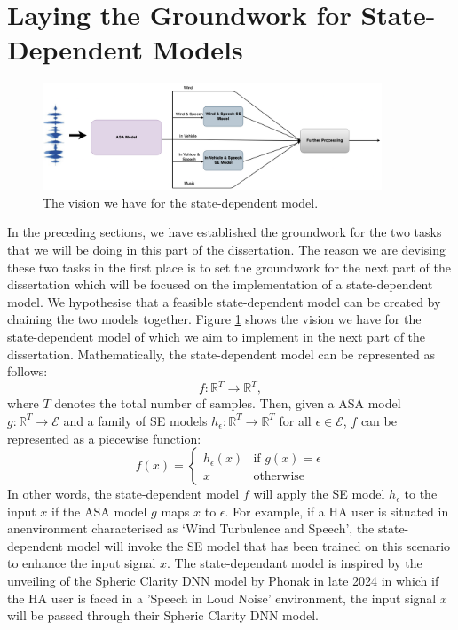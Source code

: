 \documentclass[logo,bsc,singlespacing,parskip,online]{infthesis}
\begin{document}
\section{Laying the Groundwork for State-Dependent Models}
\begin{figure}[h] \centering
   \includegraphics[width=0.9\textwidth]{state-model-diagram.png}
   \caption{The vision we have for the state-dependent model.}
   \label{fig:state-dependent-model}
\end{figure}
In the preceding sections, we have established the groundwork for the two tasks that we will be doing in this part of the dissertation.
The reason we are devising these two tasks in the first place is to set the groundwork for the next part of the dissertation which 
will be focused on the implementation of a state-dependent model. We hypothesise that a feasible state-dependent model can be created 
by chaining the two models together. Figure \ref{fig:state-dependent-model} shows the vision we have for the state-dependent model 
of which we aim to implement in the next part of the dissertation.
Mathematically, the state-dependent model can be represented as follows:
\[
f: \mathbb{R}^{T} \to \mathbb{R}^{T},
\]
where \(T\) denotes the total number of samples. 
Then, given a ASA model $g : \mathbb{R}^{T} \to \mathcal{E}$ and a family of SE models $h_{\epsilon} : \mathbb{R}^{T} \to \mathbb{R}^{T}$ for all $\epsilon \in \mathcal{E}$, 
$f$ can be represented as a piecewise function:
\begin{equation}
   f(x) = 
   \begin{cases} 
      h_{\epsilon}(x) & \text{if } g(x) = \epsilon \\
      x & \text{otherwise}
   \end{cases}
\end{equation}
In other words, the state-dependent model $f$ will apply the SE model $h_{\epsilon}$ to the input $x$ if the ASA model $g$ maps $x$ to $\epsilon$.
For example, if a HA user is situated in anenvironment characterised as `Wind Turbulence and Speech',
the state-dependent model will invoke the SE model that has been trained on this scenario to enhance the input signal $x$.
The state-dependant model is inspired by the unveiling of the Spheric Clarity DNN model by Phonak \citep{Hasemann2024PhonakSphere} in late 2024
in which if the HA user is faced in a 'Speech in Loud Noise' environment, the input signal $x$ will be passed through their Spheric Clarity DNN model.
\end{document}
